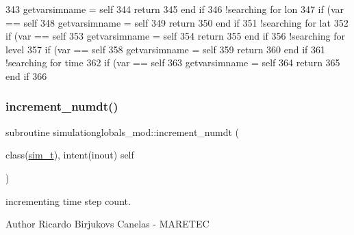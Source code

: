 \begin{DoxyCode}
343         getvarsimname = self%
344         \textcolor{keywordflow}{return}
345 \textcolor{keywordflow}{    end if}
346     \textcolor{comment}{!searching for lon}
347     \textcolor{keywordflow}{if} (var == self%
348         getvarsimname = self%
349         \textcolor{keywordflow}{return}
350 \textcolor{keywordflow}{    end if}
351     \textcolor{comment}{!searching for lat}
352     \textcolor{keywordflow}{if} (var == self%
353         getvarsimname = self%
354         \textcolor{keywordflow}{return}
355 \textcolor{keywordflow}{    end if}
356     \textcolor{comment}{!searching for level}
357     \textcolor{keywordflow}{if} (var == self%
358         getvarsimname = self%
359         \textcolor{keywordflow}{return}
360 \textcolor{keywordflow}{    end if}
361     \textcolor{comment}{!searching for time}
362     \textcolor{keywordflow}{if} (var == self%
363         getvarsimname = self%
364         \textcolor{keywordflow}{return}
365 \textcolor{keywordflow}{    end if}
366 
\end{DoxyCode}
\mbox{\label{namespacesimulationglobals__mod_ad983ee8885b275c6fa1369f1e158e078}} 
\subsubsection{\texorpdfstring{increment\+\_\+numdt()}{increment\_numdt()}}
{\footnotesize\ttfamily subroutine simulationglobals\+\_\+mod\+::increment\+\_\+numdt (\begin{DoxyParamCaption}\item[{class(\mbox{\hyperlink{structsimulationglobals__mod_1_1sim__t}{sim\+\_\+t}}), intent(inout)}]{self }\end{DoxyParamCaption})\hspace{0.3cm}{\ttfamily [private]}}



incrementing time step count. 

\begin{DoxyAuthor}{Author}
Ricardo Birjukovs Canelas -\/ M\+A\+R\+E\+T\+EC 
\end{DoxyAuthor}



